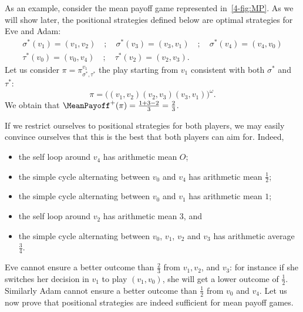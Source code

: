 As an example, consider the mean payoff game represented in~\cref{4-fig:MP}. 
As we will show later, the positional strategies defined below are optimal strategies for Eve and Adam:
\[
\begin{array}{l}
\sigma^*(v_1) = (v_1,v_2) \quad ; \quad \sigma^*(v_3) = (v_3,v_1) \quad ; \quad \sigma^*(v_4) = (v_4,v_0) \\
\tau^*(v_0) = (v_0,v_4) \quad ; \quad \tau^*(v_2) = (v_2,v_3).
\end{array}
\]
Let us consider $\pi = \pi^{v_1}_{\sigma^*,\tau^*}$ the play starting from $v_1$ consistent with both $\sigma^*$ and $\tau^*$:
\[
\pi = \big((v_1,v_2)(v_2,v_3)(v_3,v_1)\big)^\omega.
\]
We obtain that $\MeanPayoff^+(\pi) = \frac{1 + 3 - 2}{3} = \frac{2}{3}$.

If we restrict ourselves to positional strategies for both players, 
we may easily convince ourselves that this is the best that both players can aim for. 
Indeed,
\begin{itemize}
\item the self loop around $v_4$ has arithmetic mean $O$;
\item the simple cycle alternating between $v_0$ and $v_4$ has arithmetic mean $\frac{1}{2}$;
\item the simple cycle alternating between $v_0$ and $v_1$ has arithmetic mean $1$;
\item the self loop around $v_2$ has arithmetic mean $3$, and
\item the simple cycle alternating between $v_0$, $v_1$, $v_2$ and $v_3$ has arithmetic average $\frac{3}{4}$.
\end{itemize}
Eve cannot ensure a better outcome than $\frac{2}{3}$ from $v_1,v_2$, and $v_3$:
for instance if she switches her decision in $v_1$ to play $(v_1,v_0)$, 
she will get a lower outcome of $\frac{1}{2}$.
Similarly Adam cannot ensure a better outcome than $\frac{1}{2}$ from $v_0$ and $v_4$.
Let us now prove that positional strategies are indeed sufficient for mean payoff games.
 
